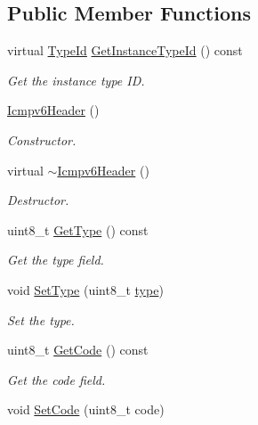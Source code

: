 \subsection*{Public Member Functions}
\begin{DoxyCompactItemize}
\item 
virtual \hyperlink{classns3_1_1TypeId}{Type\+Id} \hyperlink{classns3_1_1Icmpv6Header_a759aaa68350cfee3227ddd66d8320ffa}{Get\+Instance\+Type\+Id} () const 
\begin{DoxyCompactList}\small\item\em Get the instance type ID. \end{DoxyCompactList}\item 
\hyperlink{classns3_1_1Icmpv6Header_a42dc2dcce14e342a6faa9fd834570bac}{Icmpv6\+Header} ()
\begin{DoxyCompactList}\small\item\em Constructor. \end{DoxyCompactList}\item 
virtual \hyperlink{classns3_1_1Icmpv6Header_aafe4a825cfcde6231db25b9f7ae8608a}{$\sim$\+Icmpv6\+Header} ()
\begin{DoxyCompactList}\small\item\em Destructor. \end{DoxyCompactList}\item 
uint8\+\_\+t \hyperlink{classns3_1_1Icmpv6Header_a739eb76b792c840e9729110cb9d3ba1d}{Get\+Type} () const 
\begin{DoxyCompactList}\small\item\em Get the type field. \end{DoxyCompactList}\item 
void \hyperlink{classns3_1_1Icmpv6Header_acd72c655fc99e3b4399501bd14149c52}{Set\+Type} (uint8\+\_\+t \hyperlink{visualizer-ideas_8txt_add98db9e15e2a58cf2b57623e7aa893a}{type})
\begin{DoxyCompactList}\small\item\em Set the type. \end{DoxyCompactList}\item 
uint8\+\_\+t \hyperlink{classns3_1_1Icmpv6Header_a0a66ddd5032075acb43d43677c343496}{Get\+Code} () const 
\begin{DoxyCompactList}\small\item\em Get the code field. \end{DoxyCompactList}\item 
void \hyperlink{classns3_1_1Icmpv6Header_aa08a37a07a6a11973b2603e69d6e859c}{Set\+Code} (uint8\+\_\+t code)

\end{DoxyCompactItemize}
